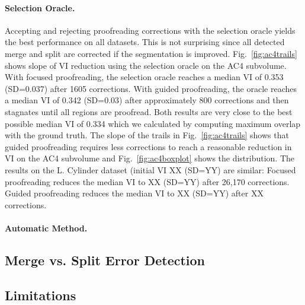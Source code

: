 \paragraph{Selection Oracle.} Accepting and rejecting proofreading corrections with the selection oracle yields the best performance on all datasets. This is not surprising since all detected merge and split are corrected if the segmentation is improved. Fig.~\ref{fig:ac4trails} shows slope of VI reduction using the selection oracle on the AC4 subvolume. With focused proofreading, the selection oracle reaches a median VI of 0.353 (SD=0.037) after 1605 corrections. With guided proofreading, the oracle reaches a median VI of 0.342 (SD=0.03) after approximately 800 corrections and then stagnates until all regions are proofread. Both results are very close to the best possible median VI of 0.334 which we calculated by computing maximum overlap with the ground truth. The slope of the trails in Fig.~\ref{fig:ac4trails} shows that guided proofreading requires less corrections to reach a reasonable reduction in VI on the AC4 subvolume and Fig.~\ref{fig:ac4boxplot} shows the distribution.
The results on the L. Cylinder dataset (initial VI XX (SD=YY) are similar: Focused proofreading reduces the median VI to XX (SD=YY) after 26,170 corrections. Guided proofreading reduces the median VI to XX (SD=YY) after XX corrections.

\paragraph{Automatic Method.} 

\subsection{Merge vs. Split Error Detection}

\subsection{Limitations}

